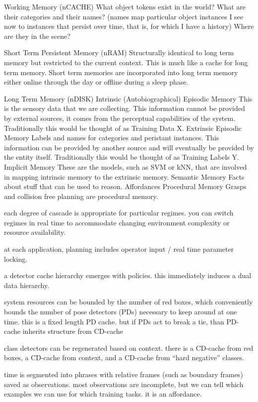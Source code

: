 \documentclass[conference]{IEEEtran}
\begin{document}
Working Memory (nCACHE)
  What object tokens exist in the world? 
  What are their categories and their names? 
    (names map particular object instances I see now to instances that persist over
     time, that is, for which I have a history)
  Where are they in the scene?

Short Term Persistent Memory (nRAM)
  Structurally identical to long term memory but restricted to the current context.
  This is much like a cache for long term memory. Short term memories are incorporated 
  into long term memory either online through the day or offline during a sleep phase.
  
Long Term Memory (nDISK)
  Intrinsic (Autobiographical) Episodic Memory
    This is the sensory data that we are collecting.
    This information cannot be provided by external
    sources, it comes from the perceptual capabilities of the system.
    Traditionally this would be thought of as Training Data X.
  Extrinsic Episodic Memory
    Labels and names for categories and peristant instances.
    This information can be provided by another source and will
    eventually be provided by the entity itself.
    Traditionally this would be thought of as Training Labels Y.
  Implicit Memory
    These are the models, such as SVM or kNN, that are involved in
    mapping intrinsic memory to the extrinsic memory.
  Semantic Memory
    Facts about stuff that can be used to reason. Affordances
  Procedural Memory
    Grasps and collision free planning are procedural memory.


each degree of cascade is appropriate for particular regimes. you can switch regimes in 
real time to accommodate changing environment complexity or resource availability.

at each application, planning includes operator input / real time parameter locking.

a detector cache hierarchy emerges with policies. this immediately induces a dual data hierarchy.

system resources can be bounded by the number of red boxes, which conveniently bounds 
the number of pose detectors (PDs) necessary to keep around at one time. this is a 
fixed length PD cache. but if PDs act to break a tie, than PD-cache inherits structure from CD-cache

class detectors can be regenerated based on context. there is a CD-cache from red 
boxes, a CD-cache from context, and a CD-cache from “hard negative” classes.

time is segmented into phrases with relative frames (such as boundary frames) saved 
as observations. most observations are incomplete, but we can tell which examples we 
can use for which training tasks.  it is an affordance.
\end{document}
